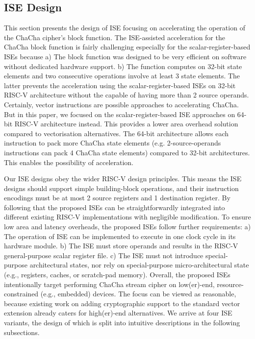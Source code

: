 \subsection{ISE Design}

This section presents the design of ISE focusing on accelerating the operation of the ChaCha cipher's block function. 
The ISE-assisted acceleration for the ChaCha block function is fairly challenging especially for the scalar-register-based ISEs because 
a) The block function was designed to be very efficient on software without dedicated hardware support. 
b) The function computes on 32-bit state elements and two consecutive operations involve at least 3 state elements. 
The latter prevents the acceleration using the scalar-register-based ISEs on 32-bit RISC-V architecture without the capable of having more than 2 source operands.
Certainly, vector instructions are possible approaches to accelerating ChaCha. 
But in this paper, we focused on the scalar-register-based ISE approaches on 64-bit RISC-V architecture instead. 
This provides a lower area overhead solution compared to vectorisation alternatives. 
The 64-bit architecture allows each instruction to pack more ChaCha state elements (e.g. 2-source-operands instructions can pack 4 ChaCha state elements) compared to 32-bit architectures. 
This enables the possibility of acceleration.

Our ISE designs obey the wider RISC-V design principles. 
This means the ISE designs should support simple building-block operations, and their instruction encodings must be at most 2 source registers and 1 destination register. 
By following that the proposed ISEs can be straightforwardly integrated into different existing RISC-V implementations with negligible modification.
To ensure low area and latency overheads, the proposed ISEs follow further requirements: 
a) The operation of ISE can be implemented to execute in one clock cycle in its hardware module. 
b) The ISE must store operands and results in the RISC-V general-purpose scalar register file. 
c) The ISE must not introduce special-purpose architectural states, nor rely on special-purpose micro-architectural state (e.g., registers, caches, or scratch-pad memory).
Overall, the proposed ISEs intentionally target performing ChaCha stream cipher on low(er)-end, resource-constrained (e.g., embedded) devices. The focus can be viewed as reasonable, because existing work on adding cryptographic support to the standard vector extension \cite{riscv:ext:vector:draft} already caters for high(er)-end alternatives. 
We arrive at four ISE variants, the design of which is split into intuitive descriptions in the following subsections. 

